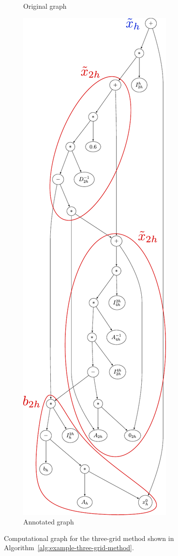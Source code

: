 \begin{figure}
\begin{subfigure}[b]{0.49\textwidth}
		\caption{Original graph}
		\label{fig:example-three-grid-method-computational-graph-original}
	\end{subfigure}
	\begin{subfigure}[b]{0.49\textwidth}
 	\centering
		\includegraphics[scale=0.5]{figures/trees/three_grid_method_computational_graph_annotated.pdf}
		\caption{Annotated graph}
		\label{fig:example-three-grid-method-computational-graph-annotated}
	\end{subfigure}
	\caption{Computational graph for the three-grid method shown in Algorithm~\ref{alg:example-three-grid-method}.}
	\label{fig:example-three-grid-method-computational-graph}
\end{figure}
